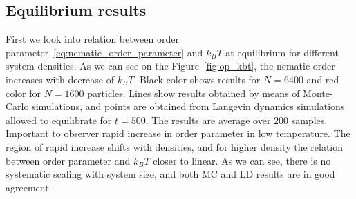 \subsection{Equilibrium results}
\label{subsec:monte_carlo_results}
First we look into relation between order parameter~\eqref{eq:nematic_order_parameter} and $k_BT$ at equilibrium for different system densities. As we can see on the Figure~\ref{fig:op_kbt}, the nematic order increases with decrease of $k_BT$. Black color shows results for $N = 6400$ and red color for $N = 1600$ particles. Lines show results obtained by means of Monte-Carlo simulations, and points are obtained from Langevin dynamics simulations allowed to equilibrate for $t = 500$. The results are average over $200$ samples. Important to observer rapid increase in order parameter in low temperature. The region of rapid increase shifts with densities, and for higher density the relation between order parameter and $k_BT$ closer to linear. As we can see, there is no systematic scaling with system size, and both MC and LD results are in good agreement.

